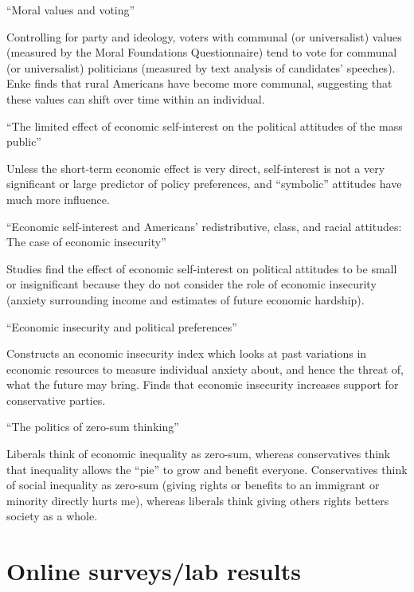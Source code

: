 \documentclass{article}
\begin{document}
\medskip \noindent \textbf{\cite{enke2020moral}} ``Moral values and voting''

Controlling for party and ideology, voters with communal (or universalist) values (measured by the Moral Foundations Questionnaire) tend to vote for communal (or universalist) politicians (measured by text analysis of candidates’ speeches).  Enke finds that rural Americans have become more communal, suggesting that these values can shift over time within an individual.

\medskip \noindent \textbf{\cite{sears1990limited}} ``The limited effect of economic self-interest on the political attitudes of the mass public''

Unless the short-term economic effect is very direct, self-interest is not a very significant or large predictor of policy preferences, and “symbolic” attitudes have much more influence.

\medskip \noindent \textbf{\cite{melcher2023economic}} ``Economic self-interest and Americans’ redistributive, class, and racial attitudes: The case of economic insecurity''

Studies find the effect of economic self-interest on political attitudes to be small or insignificant because they do not consider the role of economic insecurity (anxiety surrounding income and estimates of future economic hardship).

\medskip \noindent \textbf{\cite{bossert2023economic}} ``Economic insecurity and political preferences''

Constructs an economic insecurity index which looks at past variations in economic resources to measure individual anxiety about, and hence the threat of, what the future may bring. Finds that economic insecurity increases support for conservative parties.

\medskip \noindent \textbf{\cite{davidai2019politics}} ``The politics of zero-sum thinking''

Liberals think of economic inequality as zero-sum, whereas conservatives think that inequality allows the ``pie'' to grow and benefit everyone. Conservatives think of social inequality as zero-sum (giving rights or benefits to an immigrant or minority directly hurts me), whereas liberals think giving others rights betters society as a whole.


\section*{Online surveys/lab results}
\end{document}
